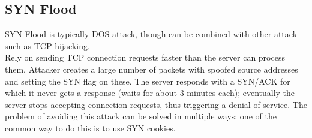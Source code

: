 \subsection{SYN Flood}
SYN Flood is typically DOS attack, though can be combined with other attack such as TCP hijacking.\\
Rely on sending TCP connection requests faster than the server can process them. Attacker creates a large number of packets with spoofed source addresses and setting the SYN flag on these. The server responds with a SYN/ACK for which it never gets a response (waits for about 3 minutes each); eventually the server stops accepting connection requests, thus triggering a denial of service.
The problem of avoiding this attack can be solved in multiple ways: one of the common way to do this is to use SYN cookies.
